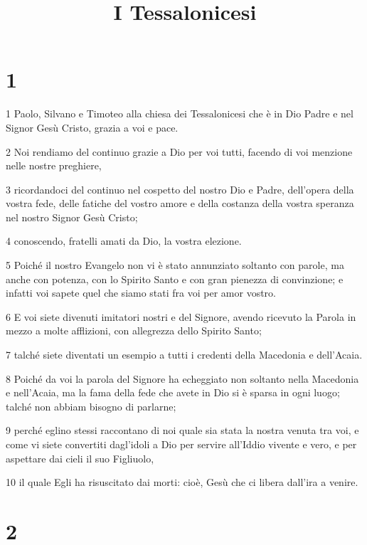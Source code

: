 

\title{I Tessalonicesi}


\chapter{1}

\par 1 Paolo, Silvano e Timoteo alla chiesa dei Tessalonicesi che è in Dio Padre e nel Signor Gesù Cristo, grazia a voi e pace.
\par 2 Noi rendiamo del continuo grazie a Dio per voi tutti, facendo di voi menzione nelle nostre preghiere,
\par 3 ricordandoci del continuo nel cospetto del nostro Dio e Padre, dell'opera della vostra fede, delle fatiche del vostro amore e della costanza della vostra speranza nel nostro Signor Gesù Cristo;
\par 4 conoscendo, fratelli amati da Dio, la vostra elezione.
\par 5 Poiché il nostro Evangelo non vi è stato annunziato soltanto con parole, ma anche con potenza, con lo Spirito Santo e con gran pienezza di convinzione; e infatti voi sapete quel che siamo stati fra voi per amor vostro.
\par 6 E voi siete divenuti imitatori nostri e del Signore, avendo ricevuto la Parola in mezzo a molte afflizioni, con allegrezza dello Spirito Santo;
\par 7 talché siete diventati un esempio a tutti i credenti della Macedonia e dell'Acaia.
\par 8 Poiché da voi la parola del Signore ha echeggiato non soltanto nella Macedonia e nell'Acaia, ma la fama della fede che avete in Dio si è sparsa in ogni luogo; talché non abbiam bisogno di parlarne;
\par 9 perché eglino stessi raccontano di noi quale sia stata la nostra venuta tra voi, e come vi siete convertiti dagl'idoli a Dio per servire all'Iddio vivente e vero, e per aspettare dai cieli il suo Figliuolo,
\par 10 il quale Egli ha risuscitato dai morti: cioè, Gesù che ci libera dall'ira a venire.

\chapter{2}

